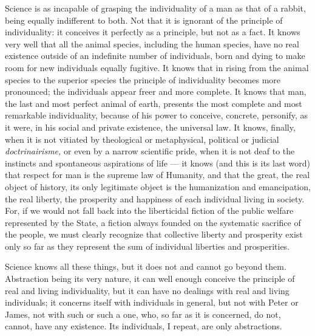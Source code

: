\documentclass[12pt]{report}
\begin{document}
Science is as incapable of grasping the individuality of a man as that of a rabbit, being equally indifferent to both. Not that it is ignorant of the principle of individuality: it conceives it perfectly as a principle, but not as a fact. It knows very well that all the animal species, including the human species, have no real existence outside of an indefinite number of individuals, born and dying to make room for new individuals equally fugitive. It knows that in rising from the animal species to the superior species the principle of individuality becomes more pronounced; the individuals appear freer and more complete. It knows that man, the last and most perfect animal of earth, presents the most complete and most remarkable individuality, because of his power to conceive, concrete, personify, as it were, in his social and private existence, the universal law. It knows, finally, when it is not vitiated by theological or metaphysical, political or judicial \emph{doctrinairisme,} or even by a narrow scientific pride, when it is not deaf to the instincts and spontaneous aspirations of life — it knows (and this is its last word) that respect for man is the supreme law of Humanity, and that the great, the real object of history, its only legitimate object is the humanization and emancipation, the real liberty, the prosperity and happiness of each individual living in society. For, if we would not fall back into the liberticidal fiction of the public welfare represented by the State, a fiction always founded on the systematic sacrifice of the people, we must clearly recognize that collective liberty and prosperity exist only so far as they represent the sum of individual liberties and prosperities.


Science knows all these things, but it does not and cannot go beyond them. Abstraction being its very nature, it can well enough conceive the principle of real and living individuality, but it can have no dealings with real and living individuals; it concerns itself with individuals in general, but not with Peter or James, not with such or such a one, who, so far as it is concerned, do not, cannot, have any existence. Its individuals, I repeat, are only abstractions.
\end{document}
